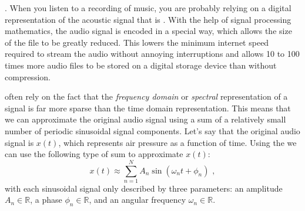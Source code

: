 . When you
listen to a recording of music, you are probably relying on a digital
representation of the acoustic signal that
is \emph{}. With the help of signal
processing mathematics, the audio signal is encoded in a special way,
which allows the size of the file to be greatly reduced. This lowers
the minimum internet speed required to stream the audio without
annoying interruptions and allows 10 to 100 times more audio files to
be stored on a digital storage device than without compression.

often rely on the fact that the \emph{frequency domain}
or \emph{spectral} representation of a signal is far more sparse than
the time domain representation. This means that we can approximate the
original audio signal using a sum of a relatively small number of
periodic sinusoidal signal components. Let's say that the original
audio signal is $x(t)$, which represents air pressure as a function of
time. Using the  we can use the
following type of sum to approximate $x(t)$:
\begin{equation}
x(t) \approx \sum_{n=1}^{N} A_n \sin(\omega_n t + \phi_n) \,\,,
\label{ch01:eq:fourier_ser}
\end{equation}
with each sinusoidal signal only described by three parameters: an
amplitude $A_n \in \mathbb{R}$, a phase $\phi_n \in \mathbb{R}$, and an angular frequency $\omega_n \in \mathbb{R}$.

